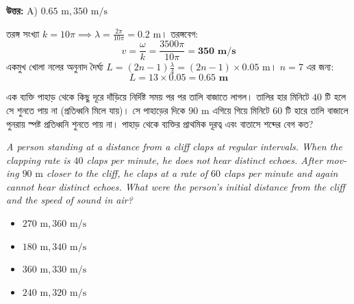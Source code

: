 \documentclass[12pt, a4paper]{article}
\begin{document}
\vspace{0.5em}
\begin{tcolorbox}[answerbox]
    \textbf{\color{success} উত্তর:} A) $0.65\text{ m}, 350\text{ m/s}$
\end{tcolorbox}
\vspace{1em}

\begin{tcolorbox}[solutionbox={সমাধান (Solution)}]
    \noindent
    তরঙ্গ সংখ্যা $k = 10\pi \implies \lambda = \frac{2\pi}{10\pi} = 0.2\text{ m}$। তরঙ্গবেগ:
    \[ v = \frac{\omega}{k} = \frac{3500\pi}{10\pi} = \mathbf{350\text{ m/s}} \]
    একমুখ খোলা নলের অনুনাদ দৈর্ঘ্য $L = (2n-1)\frac{\lambda}{4} = (2n-1) \times 0.05\text{ m}$। $n = 7$ এর জন্য:
    \[ L = 13 \times 0.05 = \mathbf{0.65\text{ m}} \]
\end{tcolorbox}

\vspace{2em}

\begin{tcolorbox}[questionbox={প্রশ্ন (Question) 22}]
    \noindent
    এক ব্যক্তি পাহাড় থেকে কিছু দূরে দাঁড়িয়ে নির্দিষ্ট সময় পর পর তালি বাজাতে লাগল। তালির হার মিনিটে $40$ টি হলে সে শুনতে পায় না (প্রতিধ্বনি মিলে যায়)। সে পাহাড়ের দিকে $90\text{ m}$ এগিয়ে গিয়ে মিনিটে $60$ টি হারে তালি বাজালে পুনরায় স্পষ্ট প্রতিধ্বনি শুনতে পায় না। পাহাড় থেকে ব্যক্তির প্রাথমিক দূরত্ব এবং বাতাসে শব্দের বেগ কত?
    
    \vspace{0.8em}
    \begin{english}
    \noindent\textit{\color{darkgray}
    A person standing at a distance from a cliff claps at regular intervals. When the clapping rate is $40$ claps per minute, he does not hear distinct echoes. After moving $90\text{ m}$ closer to the cliff, he claps at a rate of $60$ claps per minute and again cannot hear distinct echoes. What were the person's initial distance from the cliff and the speed of sound in air?
    }
    \end{english}
\end{tcolorbox}

\begin{itemize}[label={}, leftmargin=1cm, itemsep=0.5em]
    \item[\textbf{A)}] $270\text{ m}, 360\text{ m/s}$
    \item[\textbf{B)}] $180\text{ m}, 340\text{ m/s}$
    \item[\textbf{C)}] $360\text{ m}, 330\text{ m/s}$
    \item[\textbf{D)}] $240\text{ m}, 320\text{ m/s}$
\end{itemize}
\end{document}
